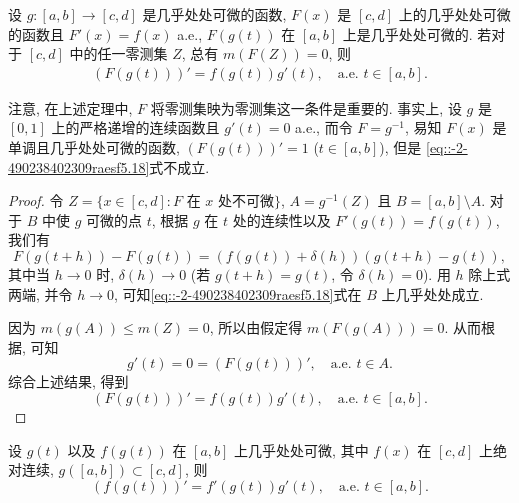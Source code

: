 \documentclass[../../main.tex]{subfiles}%
\begin{document}
\begin{theorem}[复合函数的微分]\label{theorem:实变函数--复合函数的微分}
设 $g: [a,b]\to[c,d]$ 是几乎处处可微的函数, $F(x)$ 是 $[c,d]$ 上的几乎处处可微的函数且 $F'(x)=f(x)$ a.e., $F(g(t))$ 在 $[a,b]$ 上是几乎处处可微的. 若对于 $[c,d]$ 中的任一零测集 $Z$, 总有 $m(F(Z))=0$, 则
\begin{align}
(F(g(t)))' = f(g(t))g'(t), \quad \text{a.e. } t\in[a,b]. \label{eq::-2-490238402309raesf5.18}
\end{align}
\end{theorem}
\begin{remark}
注意, 在上述定理中, $F$ 将零测集映为零测集这一条件是重要的. 事实上, 设 $g$ 是 $[0,1]$ 上的严格递增的连续函数且 $g'(t)=0$ a.e., 而令 $F = g^{-1}$, 易知 $F(x)$ 是单调且几乎处处可微的函数, $(F(g(t)))' = 1$ ($t\in[a,b]$), 但是 \eqref{eq::-2-490238402309raesf5.18}式不成立.
\end{remark}
\begin{proof}
令 $Z = \{x\in[c,d]: F \text{ 在 } x \text{ 处不可微}\}$, $A = g^{-1}(Z)$ 且 $B = [a,b]\setminus A$. 对于 $B$ 中使 $g$ 可微的点 $t$, 根据 $g$ 在 $t$ 处的连续性以及 $F'(g(t))=f(g(t))$, 我们有
\[
F(g(t+h)) - F(g(t)) = (f(g(t))+\delta(h))(g(t+h)-g(t)),
\]
其中当 $h\to 0$ 时, $\delta(h)\to 0$ (若 $g(t+h)=g(t)$, 令 $\delta(h)=0$). 用 $h$ 除上式两端, 并令 $h\to 0$, 可知\eqref{eq::-2-490238402309raesf5.18}式在 $B$ 上几乎处处成立.

因为 $m(g(A))\leqslant m(Z)=0$, 所以由假定得 $m(F(g(A)))=0$. 从而根据, 可知
\[
g'(t) = 0 = (F(g(t)))', \quad \text{a.e. } t\in A.
\]
综合上述结果, 得到
\[
(F(g(t)))' = f(g(t))g'(t), \quad \text{a.e. } t\in[a,b].
\]
\end{proof}

\begin{corollary}
设 $g(t)$ 以及 $f(g(t))$ 在 $[a,b]$ 上几乎处处可微, 其中 $f(x)$ 在 $[c,d]$ 上绝对连续, $g([a,b])\subset[c,d]$, 则
\[
(f(g(t)))' = f'(g(t))g'(t), \quad \text{a.e. } t\in[a,b].
\]
\end{corollary}
\end{document}
